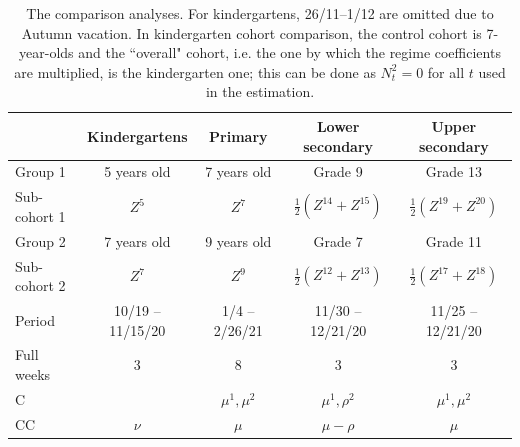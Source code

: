 \documentclass[fleqn,10pt]{wlscirep}
\begin{document}
\begin{table}
\begin{center}
\small
\begin{tabular}{l|cccc}
& Kindergartens & Primary & Lower secondary & Upper secondary  \\ \hline
Group 1 & 5 years old & 7 years old & Grade 9 & Grade 13 \\
Sub-cohort 1 & $Z^5$ & $Z^7$  
& $\frac{1}2 (Z^{14} + Z^{15})$ &  $\frac{1}2 (Z^{19} + Z^{20})$ \\ \hline
Group 2& 7 years old & 9 years old & Grade 7 & Grade 11  \\
Sub-cohort 2 & $Z^7$ &
$Z^9 $  
& $\frac{1}2 (Z^{12} + Z^{13})$ &  $\frac{1}2 (Z^{17} + Z^{18})$ 
\\ \hline
Period & 10/19 -- 11/15/20 & 1/4 -- 2/26/21 & 11/30 -- 12/21/20 & 11/25 -- 12/21/20 \\
Full weeks & 3 & 8 & 3 & 3 \\ \hline
C &
& $\mu^1,\mu^2$ & $\mu^1,\rho^2$ & $\mu^1,\mu^2$ \\ 
CC & $\nu$  & $\mu$ & $\mu-\rho$ & $\mu$ \\ 
\end{tabular}
\caption{The comparison analyses. For kindergartens, 26/11--1/12 are omitted due to Autumn vacation. In kindergarten cohort comparison, the control cohort is 7-year-olds and the ``overall" cohort, i.e. the one by which the regime coefficients are multiplied, is the kindergarten one; this can be done as $N_t^2=0$ for all $t$ used in the estimation. }
\label{tab:sc}
\end{center}
\end{table}
\end{document}
